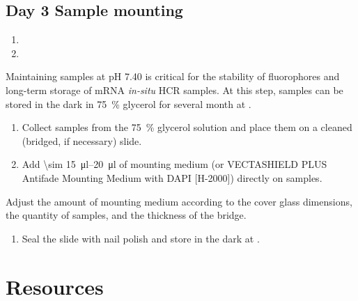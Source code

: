 \documentclass[10pt]{report}
\begin{document}
\subsection*{Day 3 \textendash{} Sample mounting}

\begin{enumerate}[series = steps]
	\item {}
	\item {}
\end{enumerate}

\bigskip\alert{Maintaining samples at pH 7.40 is critical for the stability of fluorophores and long-term storage of mRNA \textit{in-situ} HCR samples.}
\alert{At this step, samples can be stored in the dark in \qty{75}{\percent} glycerol for several month at \fourdegree.}

\begin{enumerate}[resume = steps]
	\item Collect samples from the \qty{75}{\percent} glycerol solution and place them on a cleaned (bridged, if necessary) slide.
	\item Add \qtyrange{\sim 15}{20}{\ul} of mounting medium (or VECTASHIELD\textregistered{} PLUS Antifade Mounting Medium with DAPI [H-2000]) directly on samples.
\end{enumerate}

\bigskip\alert{Adjust the amount of mounting medium according to the cover glass dimensions, the quantity of samples, and the thickness of the bridge.}

\begin{enumerate}[resume = steps]
	\item	Seal the slide with nail polish and store in the dark at \fourdegree.
\end{enumerate}

\clearpage

\section*{\textendash{} Resources \textendash{}}
\end{document}
